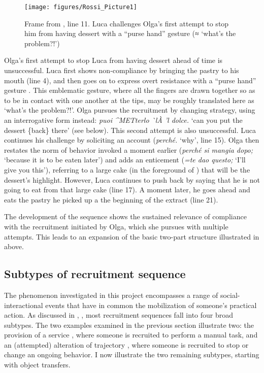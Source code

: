 \documentclass[output=paper,modfonts]{langscibook}
\begin{document}
\begin{figure}
\centering
\texttt{[image: figures/Rossi\_Picture1]}
\caption{Frame from , line 11. Luca challenges Olga's first attempt to stop him from having dessert with a “purse hand” gesture (≈ ‘what's the problem?!’)}
\label{fig:rossi:1}
\end{figure}

Olga's first attempt to stop Luca from having dessert ahead of time is unsuccessful. Luca first shows non-compliance by bringing the pastry to his mouth (line 4), and then goes on to express overt resistance with a “purse hand” gesture \citep{Poggi1983,Kendon1995}. This emblematic gesture, where all the fingers are drawn together so as to be in contact with one another at the tips, may be roughly translated here as ‘what’s the problem?!’. Olga pursues the recruitment by changing strategy, using an interrogative form instead: \textit{puoi \^{}METterlo \`{}lÀ 'l dolce.} ‘can you put the dessert \{back\} there’ (see  below). This second attempt is also unsuccessful. Luca continues his challenge by soliciting an account (\textit{perché.} ‘why’, line 15). Olga then restates the norm of behavior invoked a moment earlier (\textit{perché si mangia dopo;} ‘because it is to be eaten later’) and adds an enticement (\textit{=te dao questo;} ‘I'll give you this’), referring to a large cake (in the foreground of ) that will be the dessert's highlight. However, Luca continues to push back by saying that he is not going to eat from that large cake (line 17). A moment later, he goes ahead and eats the pastry he picked up a the beginning of the extract (line 21). 

The development of the sequence shows the sustained relevance of compliance with the recruitment initiated by Olga, which she pursues with multiple attempts. This leads to an expansion of the basic two-part structure illustrated in  above.

\subsection{Subtypes of recruitment sequence}\label{sec:rossi:2.3}

The phenomenon investigated in this project encompasses a range of social-inter\-actional events that have in common the mobilization of someone's practical action. As discussed in , , most recruitment sequences fall into four broad subtypes. The two examples examined in the previous section illustrate two: the provision of a service , where someone is recruited to perform a manual task, and an (attempted) alteration of trajectory , where someone is recruited to stop or change an ongoing behavior. I now illustrate the two remaining subtypes, starting with object transfers.
\end{document}
